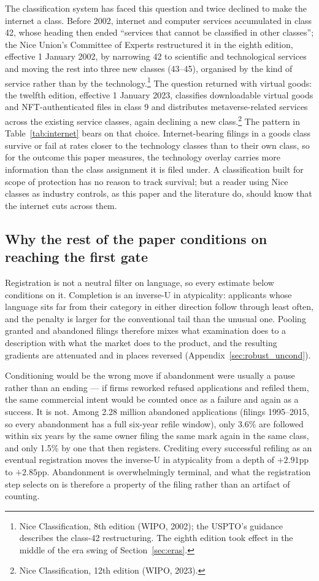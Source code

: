 The classification system has faced this question and twice declined to
make the internet a class. Before 2002, internet and computer services
accumulated in class 42, whose heading then ended ``services that cannot be
classified in other classes''; the Nice Union's Committee of Experts
restructured it in the eighth edition, effective 1 January 2002, by
narrowing 42 to scientific and technological services and moving the rest
into three new classes (43--45), organised by the kind of service rather
than by the technology.\footnote{Nice Classification, 8th edition (WIPO,
2002); the USPTO's guidance describes the class-42 restructuring. The
eighth edition took effect in the middle of the era swing of
Section~\ref{sec:eras}.} The question returned with virtual goods: the
twelfth edition, effective 1 January 2023, classifies downloadable virtual
goods and NFT-authenticated files in class 9 and distributes
metaverse-related services across the existing service classes, again
declining a new class.\footnote{Nice Classification, 12th edition (WIPO,
2023).} The pattern in Table~\ref{tab:internet} bears on that choice.
Internet-bearing filings in a goods class survive or fail at rates closer
to the technology classes than to their own class, so for the outcome this
paper measures, the technology overlay carries more information than the
class assignment it is filed under. A classification built for scope of
protection has no reason to track survival; but a reader using Nice classes
as industry controls, as this paper and the literature do, should know that
the internet cuts across them.

\subsection{Why the rest of the paper conditions on reaching the first gate}\label{sec:filter}

Registration is not a neutral filter on language, so every estimate below
conditions on it. Completion is an inverse-U in atypicality: applicants whose
language sits far from their category in either direction follow through least
often, and the penalty is larger for the conventional tail than the unusual
one. Pooling granted and abandoned filings therefore mixes what examination
does to a description with what the market does to the product, and the
resulting gradients are attenuated and in places reversed
(Appendix~\ref{sec:robust_uncond}).

Conditioning would be the wrong move if abandonment were usually a pause
rather than an ending --- if firms reworked refused applications and refiled
them, the same commercial intent would be counted once as a failure and again
as a success. It is not. Among 2.28 million abandoned applications (filings
1995--2015, so every abandonment has a full six-year refile window), only
3.6\% are followed within six years by the same owner filing the same mark
again in the same class, and only 1.5\% by one that then registers. Crediting
every successful refiling as an eventual registration moves the inverse-U in
atypicality from a depth of $+2.91$pp to $+2.85$pp. Abandonment is
overwhelmingly terminal, and what the registration step selects on is
therefore a property of the filing rather than an artifact of counting.

